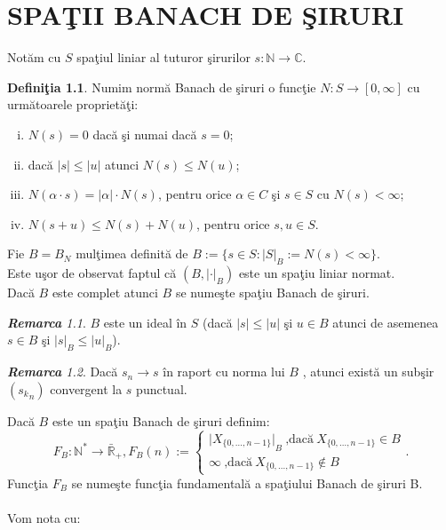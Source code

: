 \documentclass[ a4paper, 12pt]{report}
\theoremstyle{definition}
\newtheorem{definition}{\bf Defini\c tia}[section]
\theoremstyle{remark}
\newtheorem{remarc}{\bf Remarca}[section]
\numberwithin{equation}{section}
\begin{document}
\chapter{SPA\c TII BANACH DE \c SIRURI}


Not\u am cu $S$ spa\c tiul liniar al tuturor \c sirurilor $s:\mathbb{N} \rightarrow \mathbb{C}$.
\begin{definition}
Numim norm\u a Banach de \c siruri o func\c tie $N:S \rightarrow [0,\infty]$ cu urm\u atoarele propriet\u a\c ti:
\begin{enumerate}[(i)]
\item $N(s)=0$ dac\u a \c si numai dac\u a $s=0$;
\item dac\u a $\lvert s \rvert \leq \lvert u \rvert$ atunci $N(s) \leq N(u)$;
\item $N(\alpha \cdot s)=\lvert \alpha \rvert \cdot N(s)$, pentru orice $\alpha \in C$ \c si $s \in S$ cu $N(s)<\infty$;
\item $N(s+u) \leq N(s)+N(u)$, pentru orice  $s,u \in S$. 
\end{enumerate}
\end{definition}
Fie $B=B_N$ mul\c timea definit\u a de $B:=\{s \in S:{\lvert S \rvert}_B:=N(s)<\infty\}$. \\
Este u\c sor de observat faptul c\u a $(B,{\lvert \cdot \rvert}_B)$ este un spa\c tiu liniar normat.\\
Dac\u a $B$ este complet atunci $B$ se nume\c ste spa\c tiu Banach de \c siruri.
\begin{remarc}
$B$ este un ideal \^in $S$ (dac\u a $\lvert s \rvert \leq \lvert u \rvert$ \c si $u \in B$ atunci de asemenea $s \in B$ \c si ${\lvert s \rvert}_B \leq {\lvert u \rvert}_B$).
\end{remarc}
\begin{remarc}
Dac\u a $s_n \longrightarrow s$ \^in raport cu norma lui $B$ , atunci exist\u a un sub\c sir $({s_k}_n)$ convergent la $s$ punctual.
\end{remarc}
Dac\u a $B$ este un spa\c tiu Banach de \c siruri definim:\[F_B:\mathbb{N}^* \rightarrow \bar{\mathbb{R}}_+,
F_B(n):=
\begin{cases}
{\lvert X_{\{0,...,n-1\}} \rvert}_B\ \mbox{,dac\u a}\  X_{\{0,...,n-1\}} \in B \\
\infty\ \mbox{,dac\u a}\  X_{\{0,...,n-1\}} \notin B
\end{cases}.\]
Func\c tia $F_B$ se nume\c ste func\c tia fundamental\u a a spa\c tiului Banach de \c siruri B.\\
\\Vom nota cu:
\end{document}
